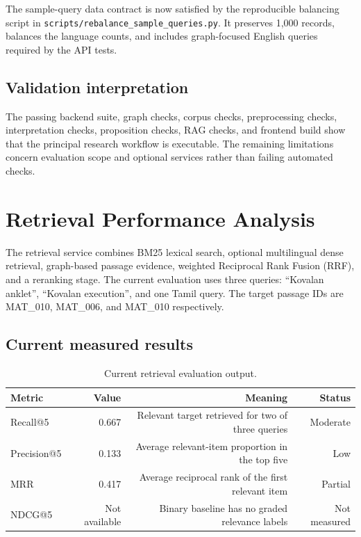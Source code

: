 \documentclass[11pt,a4paper]{article}
\begin{document}
The sample-query data contract is now satisfied by the reproducible balancing script in \texttt{scripts/rebalance\_sample\_queries.py}. It preserves 1,000 records, balances the language counts, and includes graph-focused English queries required by the API tests.

\subsection{Validation interpretation}

The passing backend suite, graph checks, corpus checks, preprocessing checks, interpretation checks, proposition checks, RAG checks, and frontend build show that the principal research workflow is executable. The remaining limitations concern evaluation scope and optional services rather than failing automated checks.

\newpage
\section{Retrieval Performance Analysis}

The retrieval service combines BM25 lexical search, optional multilingual dense retrieval, graph-based passage evidence, weighted Reciprocal Rank Fusion (RRF), and a reranking stage. The current evaluation uses three queries: ``Kovalan anklet'', ``Kovalan execution'', and one Tamil query. The target passage IDs are MAT\_010, MAT\_006, and MAT\_010 respectively.

\subsection{Current measured results}

\begin{table}[ht]
\centering
\caption{Current retrieval evaluation output.}
\label{tab:retrieval-current}
\small
\begin{tabular}{lrrr}
\toprule
\textbf{Metric} & \textbf{Value} & \textbf{Meaning} & \textbf{Status} \\
\midrule
Recall@5 & 0.667 & Relevant target retrieved for two of three queries & Moderate \\
Precision@5 & 0.133 & Average relevant-item proportion in the top five & Low \\
MRR & 0.417 & Average reciprocal rank of the first relevant item & Partial \\
NDCG@5 & Not available & Binary baseline has no graded relevance labels & Not measured \\
\bottomrule
\end{tabular}
\end{table}
\end{document}
